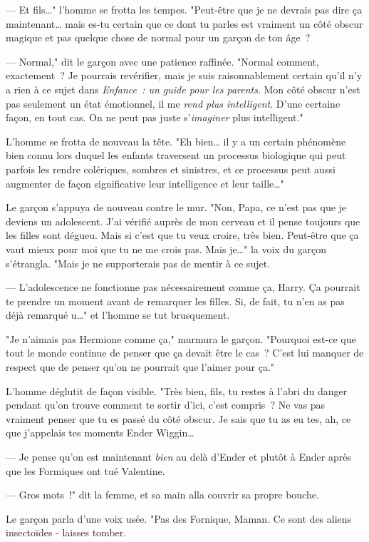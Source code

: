 --- Et fils…" l'homme se frotta les tempes. "Peut-être que je ne devrais pas dire ça maintenant… mais es-tu certain que ce dont tu parles est vraiment un côté obscur magique et pas quelque chose de normal pour un garçon de ton âge~?

--- Normal," dit le garçon avec une patience raffinée. "Normal comment, exactement~? Je pourrais revérifier, mais je suis raisonnablement certain qu'il n'y a rien à ce sujet dans \emph{Enfance~: un guide pour les parents}. Mon côté obscur n'est pas seulement un état émotionnel, il me \emph{rend plus intelligent}. D'une certaine façon, en tout cas. On ne peut pas juste s'\emph{imaginer} plus intelligent."

L'homme se frotta de nouveau la tête. "Eh bien… il y a un certain phénomène bien connu lors duquel les enfants traversent un processus biologique qui peut parfois les rendre colériques, sombres et sinistres, et ce processus peut aussi augmenter de façon significative leur intelligence et leur taille…"

Le garçon s'appuya de nouveau contre le mur. "Non, Papa, ce n'est pas que je deviens un adolescent. J'ai vérifié auprès de mon cerveau et il pense toujours que les filles sont dégueu. Mais si c'est que tu veux croire, très bien. Peut-être que ça vaut mieux pour moi que tu ne me crois pas. Mais je…" la voix du garçon s'étrangla. "Mais je ne supporterais pas de mentir à ce sujet.

--- L'adolescence ne fonctionne pas nécessairement comme ça, Harry. Ça pourrait te prendre un moment avant de remarquer les filles. Si, de fait, tu n'en as pas déjà remarqué u…" et l'homme se tut brusquement.

"Je n'aimais pas Hermione comme ça," murmura le garçon. "Pourquoi est-ce que tout le monde continue de penser que ça devait être le cas~? C'est lui manquer de respect que de penser qu'on ne pourrait que l'aimer pour ça."

L'homme déglutit de façon visible. "Très bien, fils, tu restes à l'abri du danger pendant qu'on trouve comment te sortir d'ici, c'est compris~? Ne vas pas vraiment penser que tu es passé du côté obscur. Je sais que tu as eu tes, ah, ce que j'appelais tes moments Ender Wiggin…

--- Je pense qu'on est maintenant \emph{bien} au delà d'Ender et plutôt à Ender après que les Formiques ont tué Valentine.

--- Gros mots~!" dit la femme, et sa main alla couvrir sa propre bouche.

Le garçon parla d'une voix usée. "Pas des Fornique, Maman. Ce sont des aliens insectoïdes - laisses tomber.

